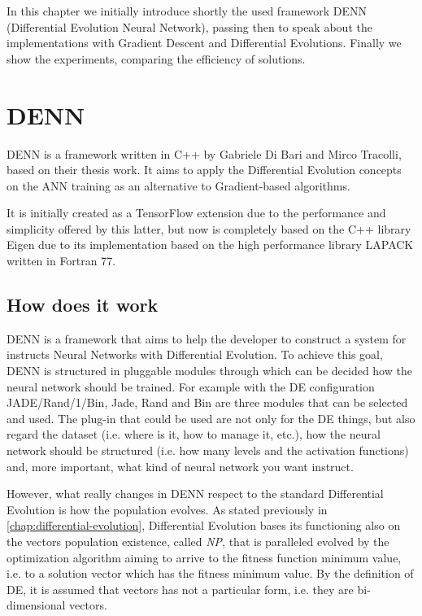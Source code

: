 In this chapter we initially introduce shortly the used framework DENN (Differential Evolution Neural Network), passing then to speak about the implementations with Gradient Descent and Differential Evolutions. Finally we show the experiments, comparing the efficiency of solutions.

\section{DENN}\label{sec:DENN}
DENN is a framework written in C++ by Gabriele Di Bari and Mirco Tracolli, based on their thesis work. It aims to apply the Differential Evolution concepts on the ANN training as an alternative to Gradient-based algorithms. 

It is initially created as a TensorFlow extension due to the performance and simplicity offered by this latter, but now is completely based on the C++ library Eigen due to its implementation based on the high performance library LAPACK written in Fortran 77.

\subsection{How does it work}
DENN is a framework that aims to help the developer to construct a system for instructs Neural Networks with Differential Evolution. To achieve this goal, DENN is structured in pluggable modules through which can be decided how the neural network should be trained. For example with the DE configuration JADE/Rand/1/Bin, Jade, Rand and Bin are three modules that can be selected and used. The plug-in that could be used are not only for the DE things, but also regard the dataset (i.e. where is it, how to manage it, etc.), how the neural network should be structured (i.e. how many levels and the activation functions) and, more important, what kind of neural network you want instruct.

However, what really changes in DENN respect to the standard Differential Evolution is how the population evolves. As stated previously in \ref{chap:differential-evolution}, Differential Evolution bases its functioning also on the vectors population existence, called \textit{NP}, that is paralleled evolved by the optimization algorithm aiming to arrive to the fitness function minimum value, i.e. to a solution vector which has the fitness minimum value. By the definition of DE, it is assumed that vectors has not a particular form, i.e. they are bi-dimensional vectors. 

